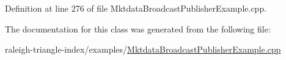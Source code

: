 Definition at line 276 of file Mktdata\+Broadcast\+Publisher\+Example.\+cpp.



The documentation for this class was generated from the following file\+:\begin{DoxyCompactItemize}
\item 
raleigh-\/triangle-\/index/examples/\hyperlink{_mktdata_broadcast_publisher_example_8cpp}{Mktdata\+Broadcast\+Publisher\+Example.\+cpp}\end{DoxyCompactItemize}
